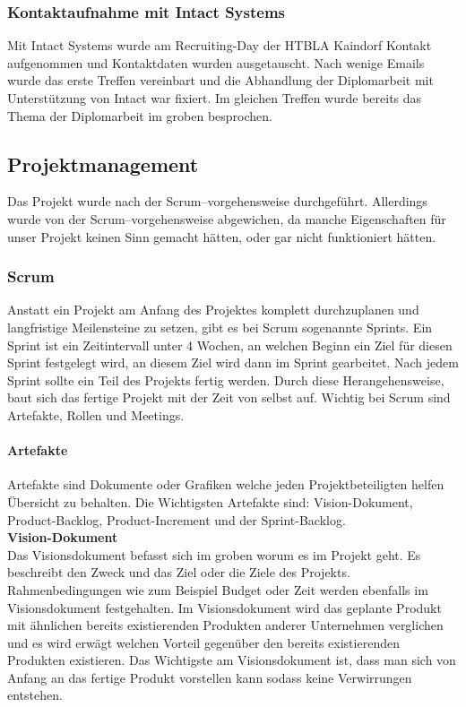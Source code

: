 	\subsubsection*{Kontaktaufnahme mit Intact Systems}
	Mit Intact Systems wurde am Recruiting-Day der HTBLA Kaindorf Kontakt aufgenommen und Kontaktdaten wurden ausgetauscht. Nach wenige Emails wurde das erste Treffen vereinbart und die Abhandlung der Diplomarbeit mit Unterstützung von Intact war fixiert. Im gleichen Treffen wurde bereits das Thema der Diplomarbeit im groben besprochen.  
	
\subsection{Projektmanagement}
\label{sec:Projektmanagement}
Das Projekt wurde nach der Scrum--vorgehensweise durchgeführt. Allerdings wurde von der Scrum--vorgehensweise abgewichen, da manche Eigenschaften für unser Projekt keinen Sinn gemacht hätten, oder gar nicht funktioniert hätten.
	\subsubsection{Scrum}
	Anstatt ein Projekt am Anfang des Projektes komplett durchzuplanen und langfristige Meilensteine zu setzen, gibt es bei Scrum sogenannte Sprints. Ein Sprint ist ein Zeitintervall unter 4 Wochen, an welchen Beginn ein Ziel für diesen Sprint festgelegt wird, an diesem Ziel wird dann im Sprint gearbeitet. Nach jedem Sprint sollte ein Teil des Projekts fertig werden. Durch diese Herangehensweise, baut sich das fertige Projekt mit der Zeit von selbst auf. Wichtig bei Scrum sind Artefakte, Rollen und Meetings.
	\paragraph{Artefakte}
	\label{sec:Artefakte}
		Artefakte sind Dokumente oder Grafiken welche jeden Projektbeteiligten helfen Übersicht zu behalten. Die Wichtigsten Artefakte sind: Vision-Dokument, Product-Backlog, Product-Increment und der Sprint-Backlog.\\
		
			\textbf{Vision-Dokument}\\
				Das Visionsdokument befasst sich im groben worum es im Projekt geht. Es beschreibt den Zweck und das Ziel oder die Ziele des Projekts. Rahmenbedingungen wie zum Beispiel Budget oder Zeit werden ebenfalls im Visionsdokument festgehalten. Im Visionsdokument wird das geplante Produkt mit ähnlichen bereits existierenden Produkten anderer Unternehmen verglichen und es wird erwägt welchen Vorteil gegenüber den bereits existierenden Produkten existieren.
			Das Wichtigste am Visionsdokument ist, dass man sich von Anfang an das fertige Produkt vorstellen kann sodass keine Verwirrungen entstehen. \\ 
						
